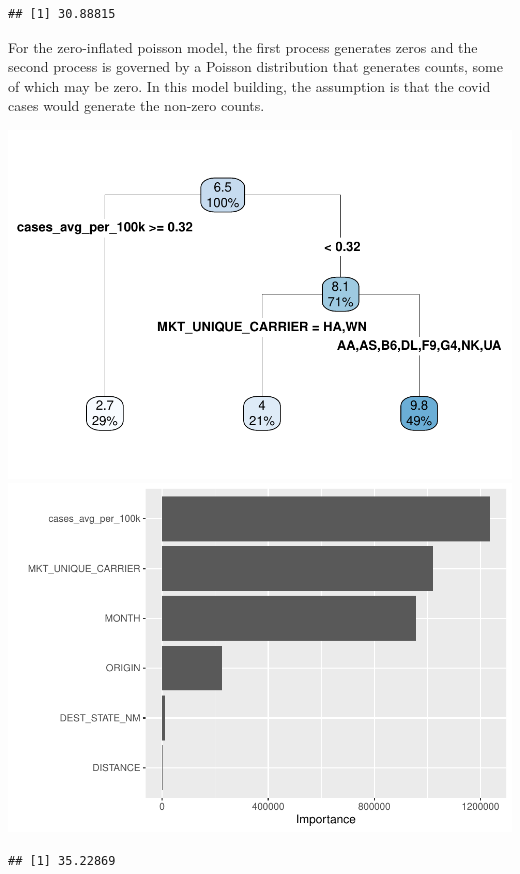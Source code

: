 \documentclass[
]{article}
\begin{document}
\begin{verbatim}
## [1] 30.88815
\end{verbatim}

For the zero-inflated poisson model, the first process generates zeros
and the second process is governed by a Poisson distribution that
generates counts, some of which may be zero. In this model building, the
assumption is that the covid cases would generate the non-zero counts.

\includegraphics{final-project_files/figure-latex/delay-tree-1.pdf}
\includegraphics{final-project_files/figure-latex/delay-tree-2.pdf}

\begin{verbatim}
## [1] 35.22869
\end{verbatim}
\end{document}
